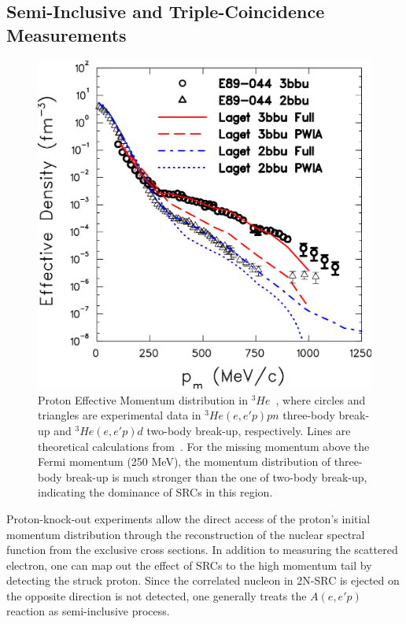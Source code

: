 \subsection{Semi-Inclusive and Triple-Coincidence Measurements}
\begin{figure}[!ht]
  \begin{center}
    \includegraphics[type=pdf,ext=.pdf,read=.pdf,width=0.60\linewidth]{./figures/physics/10yrSRC_fig3}
    \caption[Proton Effective Momentum distribution in $^{3}He$.]{\footnotesize{Proton Effective Momentum distribution in $^{3}He$~\cite{PhysRevLett.94.082305}, where circles and triangles are experimental data in $^{3}He(e,e'p)pn$ three-body break-up and $^{3}He(e,e'p)d$ two-body break-up, respectively. Lines are theoretical calculations from~\cite{Laget200549}. For the missing momentum above the Fermi momentum (250 MeV), the momentum distribution of three-body break-up is much stronger than the one of two-body break-up, indicating the dominance of SRCs in this region.}}
    \label{10yrSRC_fig3}
  \end{center}
\end{figure} 
Proton-knock-out experiments allow the direct access of the proton's initial momentum distribution through the reconstruction of the nuclear spectral function from the exclusive cross sections. In addition to measuring the scattered electron, one can map out the effect of SRCs to the high momentum tail by detecting the struck proton. Since the correlated nucleon in 2N-SRC is ejected on the opposite direction is not detected, one generally treats the $A(e,e'p)$ reaction as semi-inclusive process. 

